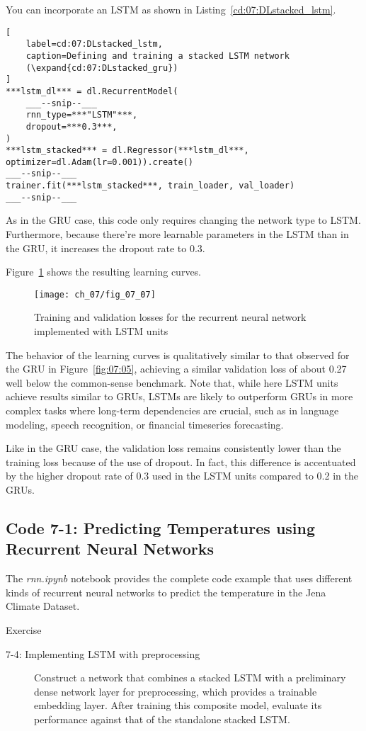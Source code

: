 You can incorporate an LSTM as shown in Listing~\ref{cd:07:DLstacked_lstm}.
\begin{lstlisting}[
    label=cd:07:DLstacked_lstm,
    caption=Defining and training a stacked LSTM network
    (\expand{cd:07:DLstacked_gru})
]
***lstm_dl*** = dl.RecurrentModel(
    ___--snip--___
    rnn_type=***"LSTM"***,
    dropout=***0.3***,
)
***lstm_stacked*** = dl.Regressor(***lstm_dl***, optimizer=dl.Adam(lr=0.001)).create()
___--snip--___
trainer.fit(***lstm_stacked***, train_loader, val_loader)
___--snip--___
\end{lstlisting}
As in the GRU case, this code only requires changing the network type to LSTM. Furthermore, because there're more learnable parameters in the LSTM  than in the GRU, it increases the dropout rate to 0.3. 

Figure~\ref{fig:07:07} shows the resulting learning curves.

\begin{figure}[H]
	\texttt{[image: ch\_07/fig\_07\_07]} 
	\caption{Training and validation losses for the recurrent neural network implemented with LSTM units}
	\label{fig:07:07}
\end{figure}

The behavior of the learning curves is qualitatively similar to that observed for the GRU in Figure~\ref{fig:07:05}, achieving a similar validation loss of about 0.27 well below the common-sense benchmark.
Note that, while here LSTM units achieve results similar to GRUs, LSTMs are likely to outperform GRUs in more complex tasks where long-term dependencies are crucial, such as in language modeling, speech recognition, or financial timeseries forecasting.

Like in the GRU case, the validation loss remains consistently lower than the training loss because of the use of dropout. In fact, this difference is accentuated by the higher dropout rate of 0.3 used in the LSTM units compared to 0.2 in the GRUs.

\subsection{Code 7-1: Predicting Temperatures using Recurrent Neural Networks}

The \emph{rnn.ipynb} notebook provides the complete code example that uses different kinds of recurrent neural networks to predict the temperature in the Jena Climate Dataset.

\begin{nspbox}{Exercise}
\begin{description}
	\item[7-4: Implementing LSTM with preprocessing]
    Construct a network that combines a stacked LSTM with a preliminary dense network layer for preprocessing, which provides a trainable embedding layer. After training this composite model, evaluate its performance against that of the standalone stacked LSTM.
\end{description}
\end{nspbox}

